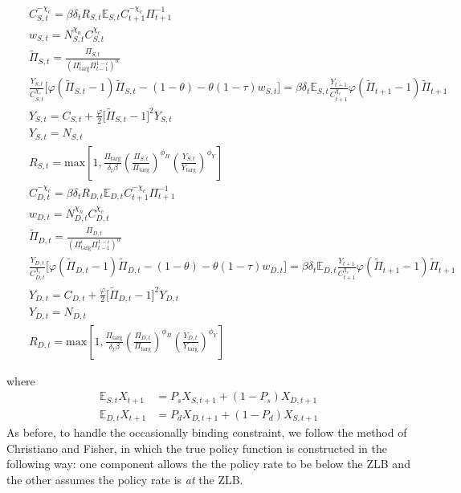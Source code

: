 \documentclass[11pt]{article}
\begin{document}
\begin{eqnarray}
& & C_{S,t}^{-\chi_{c}} = \beta\delta_tR_{S,t} \mathbb{E}_{S,t}C_{t+1}^{-\chi_{c}}\Pi_{t+1}^{-1}\label{CEEs}\\
& & w_{S,t} = N_{S,t}^{\chi_n}C_{S,t}^{\chi_c}\label{IOCs}\\
& & \tilde{\Pi}_{S,t} = \frac{\Pi_{S,t}}{\left(\Pi_{\text{targ}}^{\iota}\Pi_{t-1}^{1-\iota}\right)^{\alpha}}\label{RISs}\\
& & \frac{Y_{S,t}}{C_{S,t}^{\chi_{c}}}\bigl[ \varphi (\tilde{\Pi}_{S,t} - 1)\tilde{\Pi}_{S,t} - (1 - \theta) - \theta (1-\tau)w_{S,t}\bigr] =  \beta\delta_t\mathbb{E}_{S,t}\frac{Y_{t+1}}{C_{t+1}^{\chi_{c}}}\varphi (\tilde{\Pi}_{t+1} - 1)\tilde{\Pi}_{t+1}\label{FPCs}\\
& & Y_{S,t} = C_{S,t} + \frac{\varphi}{2}\bigl[ \tilde{\Pi}_{S,t} - 1 \bigr]^{2}Y_{S,t}\label{ARCs}\\
& & Y_{S,t} = N_{S,t}\\
& & R_{S,t} = \text{max} \left[1, \frac{\Pi_{\text{targ}}}{\delta_t\beta}\left(\frac{\Pi_{S,t}}{\Pi_{\text{targ}}}\right)^{\phi_{\Pi}}\left(\frac{Y_{S,t}}{Y_{\text{targ}}}\right)^{\phi_{Y}}\right] \label{TRs}\\
& & C_{D,t}^{-\chi_{c}} = \beta\delta_tR_{D,t} \mathbb{E}_{D,t}C_{t+1}^{-\chi_{c}}\Pi_{t+1}^{-1}\label{CEEd}\\
& & w_{D,t} = N_{D,t}^{\chi_n}C_{D,t}^{\chi_c}\label{IOCd}\\
& & \tilde{\Pi}_{D,t} = \frac{\Pi_{D,t}}{\left(\Pi_{\text{targ}}^{\iota}\Pi_{t-1}^{1-\iota}\right)^{\alpha}}\label{RISd}\\
& & \frac{Y_{D,t}}{C_{D,t}^{\chi_{c}}}\bigl[ \varphi (\tilde{\Pi}_{D,t} - 1)\tilde{\Pi}_{D,t} - (1 - \theta) - \theta (1-\tau)w_{D,t}\bigr] =  \beta\delta_t\mathbb{E}_{D,t}\frac{Y_{t+1}}{C_{t+1}^{\chi_{c}}}\varphi (\tilde{\Pi}_{t+1} - 1)\tilde{\Pi}_{t+1}\label{FPCd}\\
& & Y_{D,t} = C_{D,t} + \frac{\varphi}{2}\bigl[ \tilde{\Pi}_{D,t} - 1 \bigr]^{2}Y_{D,t}\label{ARCd}\\
& & Y_{D,t} = N_{D,t}\\
& & R_{D,t} = \text{max} \left[1, \frac{\Pi_{\text{targ}}}{\delta_t\beta}\left(\frac{\Pi_{D,t}}{\Pi_{\text{targ}}}\right)^{\phi_{\Pi}}\left(\frac{Y_{D,t}}{Y_{\text{targ}}}\right)^{\phi_{Y}}\right] \label{TRd}
\end{eqnarray}

\noindent where 
\begin{align*}
\mathbb{E}_{S,t}X_{t+1} &=P_sX_{S,t+1} + (1-P_s)X_{D,t+1} \\
\mathbb{E}_{D,t}X_{t+1} &= P_dX_{D,t+1} + (1-P_d)X_{S,t+1}
\end{align*}
\noindent
As before, to handle the occasionally binding constraint, we follow the method of Christiano and Fisher, in which the true policy function is constructed in the following way: one component allows the the policy rate to be below the ZLB and the other assumes the policy rate is \emph{at} the ZLB.
\end{document}
